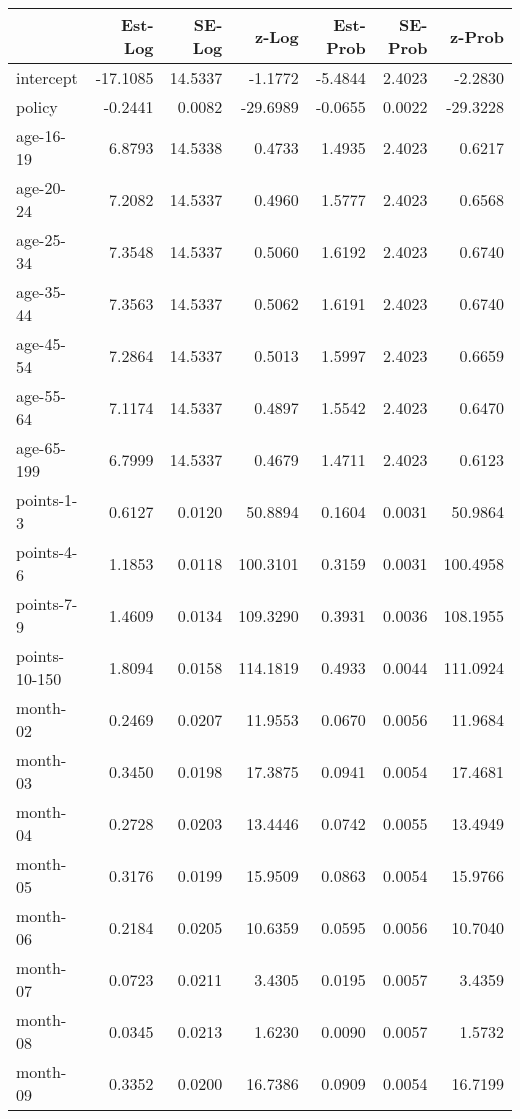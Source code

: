 \documentclass[10pt]{article}
\begin{document}
\begin{table}[ht]
\centering
\begin{tabular}{lrrrrrr}
  \hline
 & Est-Log & SE-Log & z-Log & Est-Prob & SE-Prob & z-Prob \\ 
  \hline
intercept & -17.1085 & 14.5337 & -1.1772 & -5.4844 & 2.4023 & -2.2830 \\ 
  policy & -0.2441 & 0.0082 & -29.6989 & -0.0655 & 0.0022 & -29.3228 \\ 
  age-16-19 & 6.8793 & 14.5338 & 0.4733 & 1.4935 & 2.4023 & 0.6217 \\ 
  age-20-24 & 7.2082 & 14.5337 & 0.4960 & 1.5777 & 2.4023 & 0.6568 \\ 
  age-25-34 & 7.3548 & 14.5337 & 0.5060 & 1.6192 & 2.4023 & 0.6740 \\ 
  age-35-44 & 7.3563 & 14.5337 & 0.5062 & 1.6191 & 2.4023 & 0.6740 \\ 
  age-45-54 & 7.2864 & 14.5337 & 0.5013 & 1.5997 & 2.4023 & 0.6659 \\ 
  age-55-64 & 7.1174 & 14.5337 & 0.4897 & 1.5542 & 2.4023 & 0.6470 \\ 
  age-65-199 & 6.7999 & 14.5337 & 0.4679 & 1.4711 & 2.4023 & 0.6123 \\ 
  points-1-3 & 0.6127 & 0.0120 & 50.8894 & 0.1604 & 0.0031 & 50.9864 \\ 
  points-4-6 & 1.1853 & 0.0118 & 100.3101 & 0.3159 & 0.0031 & 100.4958 \\ 
  points-7-9 & 1.4609 & 0.0134 & 109.3290 & 0.3931 & 0.0036 & 108.1955 \\ 
  points-10-150 & 1.8094 & 0.0158 & 114.1819 & 0.4933 & 0.0044 & 111.0924 \\ 
  month-02 & 0.2469 & 0.0207 & 11.9553 & 0.0670 & 0.0056 & 11.9684 \\ 
  month-03 & 0.3450 & 0.0198 & 17.3875 & 0.0941 & 0.0054 & 17.4681 \\ 
  month-04 & 0.2728 & 0.0203 & 13.4446 & 0.0742 & 0.0055 & 13.4949 \\ 
  month-05 & 0.3176 & 0.0199 & 15.9509 & 0.0863 & 0.0054 & 15.9766 \\ 
  month-06 & 0.2184 & 0.0205 & 10.6359 & 0.0595 & 0.0056 & 10.7040 \\ 
  month-07 & 0.0723 & 0.0211 & 3.4305 & 0.0195 & 0.0057 & 3.4359 \\ 
  month-08 & 0.0345 & 0.0213 & 1.6230 & 0.0090 & 0.0057 & 1.5732 \\ 
  month-09 & 0.3352 & 0.0200 & 16.7386 & 0.0909 & 0.0054 & 16.7199 \\ 

\end{tabular}
\end{table}
\end{document}
